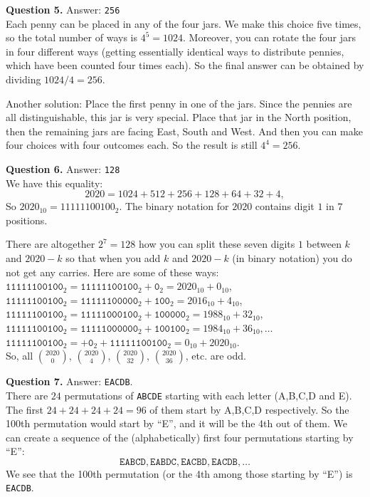 \documentclass[jou]{apa6}
\begin{document}
\vspace{10pt}
{\bf Question 5.} Answer: {\tt 256}\\
Each penny can be placed in any of the four jars. We make this choice five times, so the
total number of ways is $4^5 = 1024$. Moreover, you can rotate the four jars in four different ways (getting
essentially identical ways to distribute pennies, which have been counted four times each). 
So the final answer can be obtained by dividing $1024/4 = 256$.

Another solution: Place the first penny in one of the jars.
Since the pennies are all distinguishable, this jar is very special.
Place that jar in the North position, then the remaining jars are facing East, South and West.
And then you can make four choices with four outcomes each. So the result is still $4^4 = 256$.

\vspace{10pt}
{\bf Question 6.} Answer: {\tt 128}\\
We have this equality:
$$2020 = 1024 + 512 + 256 + 128 + 64 + 32 + 4,$$
So $2020_{10} = 11111100100_2$. The binary notation for $2020$
contains digit $1$ in $7$ positions. 

There are altogether
$2^7 = 128$ how you can split these seven digits $1$ between 
$k$ and $2020-k$ so that when you add $k$ and $2020-k$ (in binary notation) 
you do not get any carries. Here are some of these ways:\\
{\small
$\mathtt{11111100100}_2 = \mathtt{11111100100}_2 + \mathtt{0}_2 = 2020_{10}+0_{10}$,\\
$\mathtt{11111100100}_2 = \mathtt{11111100000}_2 + \mathtt{100}_2 = 2016_{10} + 4_{10}$,\\
$\mathtt{11111100100}_2 = \mathtt{11111000100}_2 + \mathtt{100000}_2 = 1988_{10} + 32_{10}$,\\
$\mathtt{11111100100}_2 = \mathtt{11111000000}_2 + \mathtt{100100}_2 = 1984_{10} + 36_{10},\ldots$\\
$\mathtt{11111100100}_2 = + \mathtt{0}_2 + \mathtt{11111100100}_2  = 0_{10} + 2020_{10}$.\\
}
So, all ${2020 \choose 0}$,  ${2020 \choose 4}$,  ${2020 \choose 32}$,  ${2020 \choose 36}$, etc. are odd.



\vspace{10pt}
{\bf Question 7.} Answer: {\tt EACDB}.\\
There are $24$ permutations of {\tt ABCDE} starting with each 
letter (A,B,C,D and E). The first $24+24+24+24=96$ of them start by A,B,C,D respectively. 
So the 100th permutation would start by ``E'', and it will be the 4th out of them. 
We can create a sequence of the (alphabetically) first four permutations starting by ``E'':
$$\mathtt{EABCD},\mathtt{EABDC},\mathtt{EACBD},\mathtt{EACDB},\ldots$$
We see that the 100th permutation (or the 4th among those starting by ``E'') is 
{\tt EACDB}.
\end{document}
